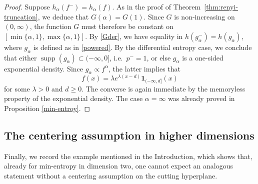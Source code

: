 \documentclass{article}
\theoremstyle{plain}
\theoremstyle{definition}
\newcommand{\1}{\mathbf 1}
\begin{document}
\begin{proof}
Suppose $h_\alpha(f^-)=h_\alpha(f)$. 
As in the proof of
Theorem~\ref{thm:renyi-truncation}, we deduce that $G(\alpha)=G(1)$. Since
$G$ is non-increasing on $(0,\infty)$, the function $G$
must therefore be constant on $[\min\{\alpha,1\},\max\{\alpha,1\}]$. By \eqref{Gder}, we have equality in $h(g_{\alpha}^-) = h(g_{\alpha})$, where $g_{\alpha}$ is defined as in \eqref{powered}. By the differential entropy case, we conclude that
either $\operatorname{supp}(g_{\alpha})\subset(-\infty,0]$, i.e.\ $p^{-}=1$, or else $g_{\alpha}$ is a one-sided exponential density. Since $g_\alpha\propto f^\alpha$, the latter implies that
\[
f(x)=\lambda e^{\lambda(x-d)}\mathbf 1_{(-\infty,d]}(x)
\]
for some $\lambda>0$ and $d\ge0$. The converse is again immediate by the memoryless property of the exponential density.  The case \(\alpha=\infty\) was already proved in Proposition \ref{min-entroy}.
\end{proof}

\subsection{The centering assumption in higher dimensions}
\label{counterexamplesec}

Finally, we record the example mentioned in the Introduction, which shows that, already for min-entropy in dimension
two, one cannot expect an analogous statement without a centering assumption on the
cutting hyperplane.
\end{document}
